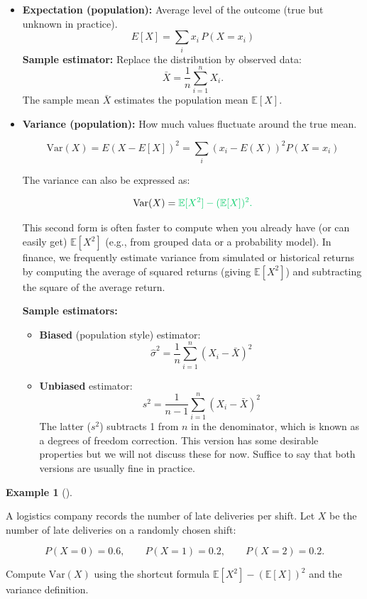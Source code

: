 \documentclass[
  12pt,
  a4paper,
]{scrbook}
\providecommand{\tightlist}{%
  \setlength{\itemsep}{0pt}\setlength{\parskip}{0pt}}
\renewcommand{\tightlist}{\setlength{\itemsep}{0.5\baselineskip}\setlength{\parskip}{0.2\baselineskip}}
\theoremstyle{plain}
\theoremstyle{definition}
\newtheorem{example}{Example}[chapter]
\theoremstyle{remark}
\begin{document}
\begin{itemize}
\item
  \textbf{Expectation (population):} Average level of the outcome (true
  but unknown in practice). \[
  E[X] = \sum_{i} x_i \, P(X = x_i)
  \] \textbf{Sample estimator:} Replace the distribution by observed
  data: \[\bar{X} = \dfrac{1}{n}\sum_{i=1}^n X_i.\] The sample mean
  \(\bar{X}\) estimates the population mean \(\mathbb{E}[X]\).
\item
  \textbf{Variance (population):} How much values fluctuate around the
  true mean.

  \[\text{Var}(X) = E(X - E[X])^2 = \sum_{i} (x_i-E(X))^2 P(X=x_i)\]

  The variance can also be expressed as:

  \[
  \text{Var}(X) = \color[HTML]{00CC66}{\mathbb{E}[X^2] - (\mathbb{E}[X])^2}.
  \]

  This second form is often faster to compute when you already have (or
  can easily get) \(\mathbb{E}[X^2]\) (e.g., from grouped data or a
  probability model). In finance, we frequently estimate variance from
  simulated or historical returns by computing the average of squared
  returns (giving \(\mathbb{E}[X^2]\)) and subtracting the square of the
  average return.

  \textbf{Sample estimators:}

  \begin{itemize}
  \tightlist
  \item
    \textbf{Biased} (population style) estimator:
    \[ \hat{\sigma}^2 = \dfrac{1}{n}\sum_{i=1}^n (X_i - \bar{X})^2 \]
  \item
    \textbf{Unbiased} estimator:
    \[s^2 = \dfrac{1}{n-1}\sum_{i=1}^n (X_i - \bar{X})^2 \] The latter
    (\(s^2\)) subtracts 1 from \(n\) in the denominator, which is known
    as a {degrees of freedom correction}. This version has some
    desirable properties but we will not discuss these for now. Suffice
    to say that both versions are usually fine in practice.
  \end{itemize}
\end{itemize}

\begin{example}[]\protect\hypertarget{exm-10}{}\label{exm-10}

A logistics company records the number of late deliveries per shift. Let
\(X\) be the number of late deliveries on a randomly chosen shift:

\[
P(X=0)=0.6, \qquad P(X=1)=0.2, \qquad P(X=2)=0.2.
\]

Compute \(\text{Var}(X)\) using the shortcut formula
\(\mathbb{E}[X^2] - (\mathbb{E}[X])^2\) and the variance definition.

\end{example}
\end{document}
